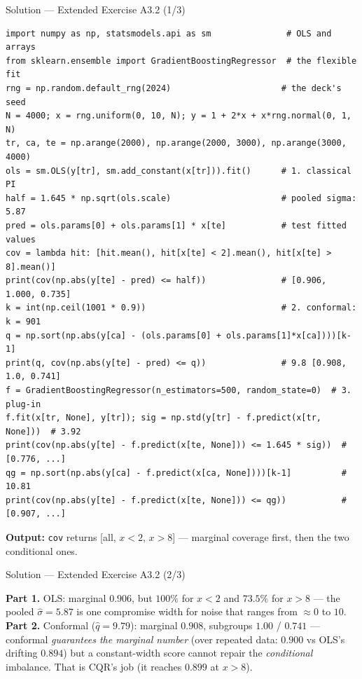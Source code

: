 \documentclass[aspectratio=169,11pt]{beamer}
\begin{document}
\begin{frame}[fragile]{Solution --- Extended Exercise A3.2 (1/3)}
\begin{solutionbox}
\begin{lstlisting}[basicstyle=\ttfamily\fontsize{7}{8.2}\selectfont]
import numpy as np, statsmodels.api as sm               # OLS and arrays
from sklearn.ensemble import GradientBoostingRegressor  # the flexible fit
rng = np.random.default_rng(2024)                      # the deck's seed
N = 4000; x = rng.uniform(0, 10, N); y = 1 + 2*x + x*rng.normal(0, 1, N)
tr, ca, te = np.arange(2000), np.arange(2000, 3000), np.arange(3000, 4000)
ols = sm.OLS(y[tr], sm.add_constant(x[tr])).fit()      # 1. classical PI
half = 1.645 * np.sqrt(ols.scale)                      # pooled sigma: 5.87
pred = ols.params[0] + ols.params[1] * x[te]           # test fitted values
cov = lambda hit: [hit.mean(), hit[x[te] < 2].mean(), hit[x[te] > 8].mean()]
print(cov(np.abs(y[te] - pred) <= half))               # [0.906, 1.000, 0.735]
k = int(np.ceil(1001 * 0.9))                           # 2. conformal: k = 901
q = np.sort(np.abs(y[ca] - (ols.params[0] + ols.params[1]*x[ca])))[k-1]
print(q, cov(np.abs(y[te] - pred) <= q))               # 9.8 [0.908, 1.0, 0.741]
f = GradientBoostingRegressor(n_estimators=500, random_state=0)  # 3. plug-in
f.fit(x[tr, None], y[tr]); sig = np.std(y[tr] - f.predict(x[tr, None]))  # 3.92
print(cov(np.abs(y[te] - f.predict(x[te, None])) <= 1.645 * sig))  # [0.776, ...]
qg = np.sort(np.abs(y[ca] - f.predict(x[ca, None])))[k-1]          # 10.81
print(cov(np.abs(y[te] - f.predict(x[te, None])) <= qg))           # [0.907, ...]
\end{lstlisting}
{\scriptsize \textbf{Output:} \texttt{cov} returns [all, $x<2$, $x>8$] ---
marginal coverage first, then the two conditional ones.\par}
\end{solutionbox}
\end{frame}

\begin{frame}{Solution --- Extended Exercise A3.2 (2/3)}
\begin{solutionbox}
  \textbf{Part 1.} OLS: marginal $0.906$, but $100\%$ for $x < 2$ and $73.5\%$ for
  $x > 8$ --- the pooled $\hat\sigma = 5.87$ is one compromise width for noise that
  ranges from $\approx 0$ to $10$.
  \textbf{Part 2.} Conformal ($\hat q = 9.79$): marginal $0.908$, subgroups $1.00$ /
  $0.741$ --- conformal \emph{guarantees the marginal number} (over repeated data:
  $0.900$ vs OLS's drifting $0.894$) but a constant-width score cannot repair the
  \emph{conditional} imbalance. That is CQR's job (it reaches $0.899$ at $x > 8$).
\end{solutionbox}
\end{frame}
\end{document}
